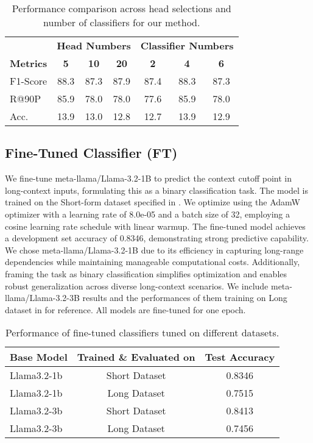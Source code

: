 \begin{table}[H]
    \centering
    \small
    \begin{tabular}{lcccccc}
        \toprule
        & \multicolumn{3}{c}{\textbf{Head Numbers}} & \multicolumn{3}{c}{\textbf{Classifier Numbers}} \\
        \cmidrule(lr){2-4} \cmidrule(lr){5-7}
        \textbf{Metrics} & \textbf{5} & \textbf{10} & \textbf{20} & \textbf{2} & \textbf{4} & \textbf{6} \\
        \midrule
        F1-Score & 88.3 & 87.3 & 87.9 & 87.4 & 88.3 & 87.3 \\
        R@90P & 85.9 & 78.0 & 78.0 & 77.6 & 85.9 & 78.0 \\
        Acc. & 13.9  & 13.0& 12.8 & 12.7 & 13.9 & 12.9 \\
        \bottomrule
    \end{tabular}
    \caption{Performance comparison across head selections and number of classifiers for our method.}
    \label{tab:heads_cla_number_compare}
\end{table}




\subsection{Fine-Tuned Classifier (FT)}
\label{app:details:small_llm}
  We fine-tune meta-llama/Llama-3.2-1B to predict the context cutoff point in long-context inputs, formulating this as a binary classification task. The model is trained on the Short-form dataset specified in . We optimize using the AdamW optimizer with a learning rate of 8.0e-05 and a batch size of 32, employing a cosine learning rate schedule with linear warmup. The fine-tuned model achieves a development set accuracy of 0.8346, demonstrating strong predictive capability. We chose meta-llama/Llama-3.2-1B due to its efficiency in capturing long-range dependencies while maintaining manageable computational costs. Additionally, framing the task as binary classification simplifies optimization and enables robust generalization across diverse long-context scenarios. We include meta-llama/Llama-3.2-3B results and the performances of them training on Long dataset in  for reference. All models are fine-tuned for one epoch.

\begin{table}[h]
\centering
\small
\begin{tabular}{lcc}
\toprule
\textbf{Base Model} & \textbf{Trained \& Evaluated on} & \textbf{Test Accuracy} \\
\midrule
Llama3.2-1b  & Short Dataset  & 0.8346 \\
Llama3.2-1b     & Long Dataset  & 0.7515 \\
Llama3.2-3b  & Short Dataset   & 0.8413 \\
Llama3.2-3b     & Long Dataset & 0.7456 \\
\bottomrule
\end{tabular}
\caption{Performance of fine-tuned classifiers tuned on different datasets.}
\label{tab:ft_classifier}
\end{table}



